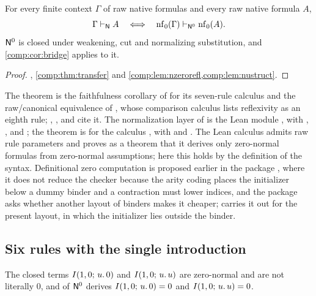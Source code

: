 \begin{theorem}
\label{comp:thm:zero}
For every finite context $\Gamma$ of raw native formulas and every raw
native formula $A$,
\[
 \Gamma\vdash_{\mathsf{N}}A
 \quad\Longleftrightarrow\quad
 \operatorname{nf}_0(\Gamma)\vdash_{\mathsf{N}^{0}}\operatorname{nf}_0(A).
\]
$\mathsf{N}^{0}$ is closed under weakening, cut and normalizing substitution, and
\cref{comp:cor:bridge} applies to it.
\end{theorem}

\begin{proof}
, \cref{comp:thm:transfer} and
\cref{comp:lem:nzerorefl,comp:lem:nustruct}.
\end{proof}

\begin{remark}
The theorem is the faithfulness corollary of  for its
seven-rule calculus and the raw/canonical equivalence of
, whose comparison calculus lists reflexivity as
an eighth rule; , ,
 and  cite it. The normalization
layer of  is the Lean module ,
with , ,  and
; the theorem is 
for the calculus , with  and
. The Lean calculus admits raw rule parameters and
proves as a theorem that it derives only zero-normal formulas from
zero-normal assumptions; here this holds by the definition of the syntax.
Definitional zero computation is proposed earlier in the package
, where it does not reduce the checker
because the arity coding places the initializer below a dummy binder and a
contraction must lower indices, and the package  asks
whether another layout of binders makes it cheaper; 
carries it out for the present layout, in which the initializer lies outside
the binder.
\end{remark}

\subsection{Six rules with the single introduction}

\begin{lemma}
\label{comp:lem:alias}
The closed terms $I(1,0;\,u.\,0)$ and $I(1,0;\,u.\,u)$ are zero-normal and
are not literally $0$, and  of $\mathsf{N}^{0}$ derives
$I(1,0;\,u.\,0)=0$ and $I(1,0;\,u.\,u)=0$.
\end{lemma}

